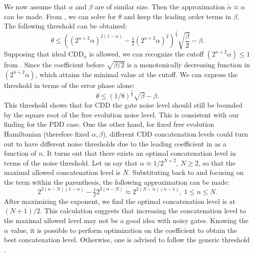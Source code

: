 \documentclass[aps,pra,reprint,superscriptaddress]{revtex4-2}
\newcommand{\alphat}{\widetilde{\alpha}}
\begin{document}
We now assume that $\alpha$ and $\beta$ are of similar size. Then the approximation $\alphat \approx \alpha$ can be made.
From , we can solve for $\theta$ and keep the leading order terms in $\beta$. The following threshold can be obtained:
\begin{equation}\label{eq:cdd-threshold}
\theta\le  \left( (2^{n+2} \alpha)^{2(1-n)}-\tfrac{1}{2}(2^{n+2} \alpha)^2\right)^{\frac{1}{4}} \sqrt{\frac{\beta}{2}}-\beta.
\end{equation}
Supposing that ideal $\mathrm{CDD}_n$ is allowed, we can recognize the cutoff $(2^{n+2} \alpha) \le 1$  from . Since the coefficient before $\sqrt{\beta/2}$ is a monotonically decreasing function in $(2^{n+2} \alpha)$, which attains the minimal value at the cutoff. We can express the threshold in terms of the error phase alone:
\begin{equation}\label{eq:cdd-threshold-erph}
\theta\le  (1/8)^{\frac{1}{4}} \sqrt{\beta}-\beta.
\end{equation}
This threshold shows that for CDD the gate noise level should still be bounded by the square root of the free evolution noise level. This is consistent with our finding for the PDD case. One the other hand, for fixed free evolution Hamiltonian (therefore fixed $\alpha,\beta$), different CDD concatenation levels could turn out to have different noise thresholds due to the leading coefficient in  as a function of $n$. 
It turns out that there exists an optimal concatenation level in terms of the noise threshold. Let us say that $\alpha\approx 1/2^{N+2}$, $N\ge2$, so that the maximal 
allowed concatenation level is $N$. Substituting back to  and focusing on the term within the parenthesis, the following approximation can be made:
\begin{equation*}
    2^{2(n-N)(1-n)} - \tfrac{1}{2}2^{2(n-N)} \approx 2^{2(N-n)(n-1)}, \ 1\le n\le N.
\end{equation*} 
After maximizing the exponent, we find the optimal concatenation level is at 
$(N+1)/2$. This calculation suggests that increasing the concatenation level to the maximal allowed level may not be a good idea with noisy gates.  
Knowing the $\alpha$ value, it is possible to perform optimization on the coefficient to obtain the best concatenation level. Otherwise, one is advised to follow the generic threshold .
\end{document}
